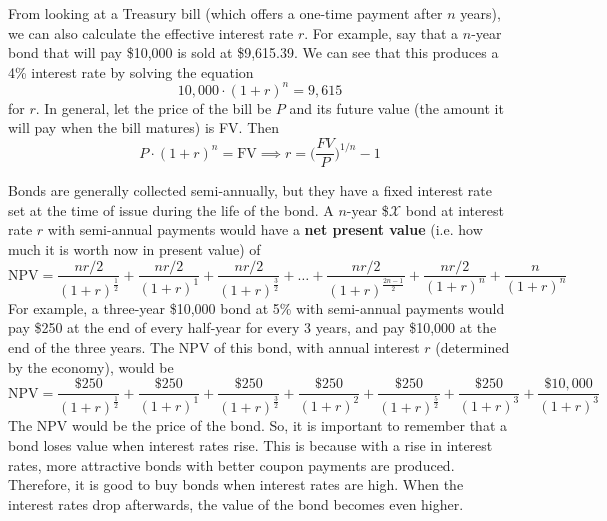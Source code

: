 \documentclass{article}
\begin{document}
    From looking at a Treasury bill (which offers a one-time payment after $n$ years), we can also calculate the effective interest rate $r$. For example, say that a $n$-year bond that will pay \$10,000 is sold at \$9,615.39. We can see that this produces a 4\% interest rate by solving the equation
    \begin{equation}
      10,000 \cdot (1 + r)^n = 9,615
    \end{equation}
    for $r$. In general, let the price of the bill be $P$ and its future value (the amount it will pay when the bill matures) is FV. Then
    \begin{equation}
      P\cdot (1 + r)^n = \text{FV} \implies r = \bigg( \frac{FV}{P} \bigg)^{1/n} - 1
    \end{equation}

    \begin{definition}
      \label{def:net-present-value-of-bonds}
      Bonds are generally collected semi-annually, but they have a fixed interest rate set at the time of issue during the life of the bond. A $n$-year \$$\mathcal{X}$ bond at interest rate $r$ with semi-annual payments would have a \textbf{net present value} (i.e. how much it is worth now in present value) of 
      \begin{equation}
        \text{NPV} = \frac{nr/2}{(1+r)^{\frac{1}{2}}} + \frac{nr/2}{(1+r)^{1}} + \frac{nr/2}{(1+r)^{\frac{3}{2}}} + \ldots + \frac{nr/2}{(1+r)^{\frac{2n-1}{2}}} + \frac{nr/2}{(1+r)^{n}} + \frac{n}{(1+r)^{n}}
      \end{equation}
      For example, a three-year \$10,000 bond at 5\% with semi-annual payments would pay \$250 at the end of every half-year for every 3 years, and pay \$10,000 at the end of the three years. The NPV of this bond, with annual interest $r$ (determined by the economy), would be
      \begin{equation}
        \text{NPV} = \frac{\$250}{(1+r)^{\frac{1}{2}}} + \frac{\$250}{(1+r)^{1}} + \frac{\$250}{(1+r)^{\frac{3}{2}}} + \frac{\$250}{(1+r)^{2}} + \frac{\$250}{(1+r)^{\frac{5}{2}}} +
              \frac{\$250}{(1+r)^{3}} + \frac{\$10,000}{(1+r)^{3}}
      \end{equation}
      The NPV would be the price of the bond. So, it is important to remember that a bond loses value when interest rates rise. This is because with a rise in interest rates, more attractive bonds with better coupon payments are produced. Therefore, it is good to buy bonds when interest rates are high. When the interest rates drop afterwards, the value of the bond becomes even higher. 
    \end{definition}
\end{document}
